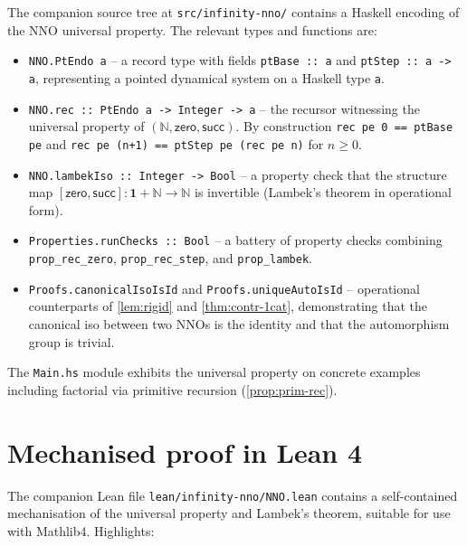 \documentclass[12pt]{article}
\theoremstyle{definition}
\theoremstyle{remark}
\newcommand{\N}{\mathbb{N}}
\newcommand{\zero}{\mathsf{zero}}
\newcommand{\suc}{\mathsf{succ}}
\begin{document}
The companion source tree at \texttt{src/infinity-nno/} contains a Haskell encoding of the NNO universal property. The relevant types and functions are:

\begin{itemize}
  \item \texttt{NNO.PtEndo a} -- a record type with fields \texttt{ptBase :: a} and \texttt{ptStep :: a -> a}, representing a pointed dynamical system on a Haskell type \texttt{a}.
  \item \texttt{NNO.rec :: PtEndo a -> Integer -> a} -- the recursor witnessing the universal property of $(\N,\zero,\suc)$. By construction \texttt{rec pe 0 == ptBase pe} and \texttt{rec pe (n+1) == ptStep pe (rec pe n)} for $n\geq 0$.
  \item \texttt{NNO.lambekIso :: Integer -> Bool} -- a property check that the structure map $[\zero,\suc]\colon\mathbf{1}+\N\to\N$ is invertible (Lambek's theorem in operational form).
  \item \texttt{Properties.runChecks :: Bool} -- a battery of property checks combining \texttt{prop\_rec\_zero}, \texttt{prop\_rec\_step}, and \texttt{prop\_lambek}.
  \item \texttt{Proofs.canonicalIsoIsId} and \texttt{Proofs.uniqueAutoIsId} -- operational counterparts of \cref{lem:rigid} and \cref{thm:contr-1cat}, demonstrating that the canonical iso between two NNOs is the identity and that the automorphism group is trivial.
\end{itemize}

The \texttt{Main.hs} module exhibits the universal property on concrete examples including factorial via primitive recursion (\cref{prop:prim-rec}).

\section{Mechanised proof in Lean 4}\label{app:lean}

The companion Lean file \texttt{lean/infinity-nno/NNO.lean} contains a self-contained mechanisation of the universal property and Lambek's theorem, suitable for use with Mathlib4. Highlights:
\end{document}
